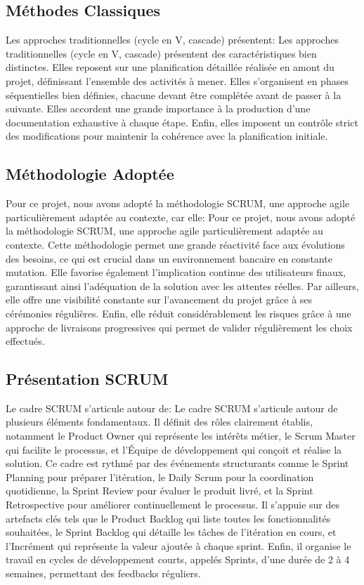 \documentclass[12pt,a4paper]{report}
\begin{document}
\subsection{Méthodes Classiques}
Les approches traditionnelles (cycle en V, cascade) présentent:
Les approches traditionnelles (cycle en V, cascade) présentent des caractéristiques bien distinctes. Elles reposent sur une planification détaillée réalisée en amont du projet, définissant l'ensemble des activités à mener. Elles s'organisent en phases séquentielles bien définies, chacune devant être complétée avant de passer à la suivante. Elles accordent une grande importance à la production d'une documentation exhaustive à chaque étape. Enfin, elles imposent un contrôle strict des modifications pour maintenir la cohérence avec la planification initiale.

\subsection{Méthodologie Adoptée}
Pour ce projet, nous avons adopté la méthodologie SCRUM, une approche agile particulièrement adaptée au contexte, car elle:
Pour ce projet, nous avons adopté la méthodologie SCRUM, une approche agile particulièrement adaptée au contexte. Cette méthodologie permet une grande réactivité face aux évolutions des besoins, ce qui est crucial dans un environnement bancaire en constante mutation. Elle favorise également l'implication continue des utilisateurs finaux, garantissant ainsi l'adéquation de la solution avec les attentes réelles. Par ailleurs, elle offre une visibilité constante sur l'avancement du projet grâce à ses cérémonies régulières. Enfin, elle réduit considérablement les risques grâce à une approche de livraisons progressives qui permet de valider régulièrement les choix effectués.

\subsection{Présentation SCRUM}
Le cadre SCRUM s'articule autour de:
Le cadre SCRUM s'articule autour de plusieurs éléments fondamentaux. Il définit des rôles clairement établis, notamment le Product Owner qui représente les intérêts métier, le Scrum Master qui facilite le processus, et l'Équipe de développement qui conçoit et réalise la solution. Ce cadre est rythmé par des événements structurants comme le Sprint Planning pour préparer l'itération, le Daily Scrum pour la coordination quotidienne, la Sprint Review pour évaluer le produit livré, et la Sprint Retrospective pour améliorer continuellement le processus. Il s'appuie sur des artefacts clés tels que le Product Backlog qui liste toutes les fonctionnalités souhaitées, le Sprint Backlog qui détaille les tâches de l'itération en cours, et l'Incrément qui représente la valeur ajoutée à chaque sprint. Enfin, il organise le travail en cycles de développement courts, appelés Sprints, d'une durée de 2 à 4 semaines, permettant des feedbacks réguliers.
\end{document}
